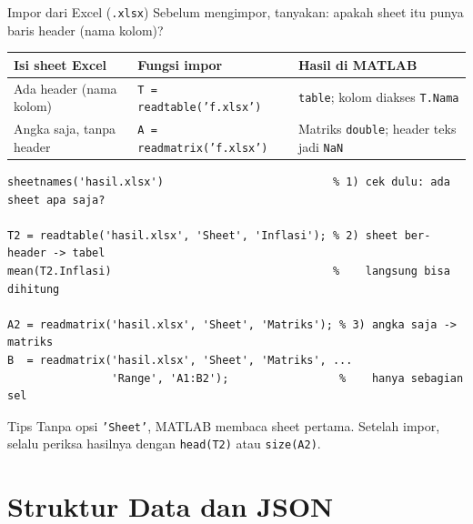 \documentclass[10pt,aspectratio=169]{beamer}
\newcommand{\kode}[1]{\texttt{\small #1}}
\begin{document}
\begin{frame}[fragile]{Impor dari Excel (\kode{.xlsx})}
  Sebelum mengimpor, tanyakan: \alert{apakah sheet itu punya baris header (nama kolom)?}

  \centering\footnotesize
  \begin{tabular}{l l l}
    \toprule
    \textbf{Isi sheet Excel} & \textbf{Fungsi impor} & \textbf{Hasil di MATLAB} \\
    \midrule
    Ada header (nama kolom)   & \texttt{T = readtable('f.xlsx')}  & \kode{table}; kolom diakses \kode{T.Nama} \\
    Angka saja, tanpa header  & \texttt{A = readmatrix('f.xlsx')} & Matriks \kode{double}; header teks jadi \kode{NaN} \\
    \bottomrule
  \end{tabular}
  \raggedright
\begin{lstlisting}
sheetnames('hasil.xlsx')                          % 1) cek dulu: ada sheet apa saja?

T2 = readtable('hasil.xlsx', 'Sheet', 'Inflasi'); % 2) sheet ber-header -> tabel
mean(T2.Inflasi)                                  %    langsung bisa dihitung

A2 = readmatrix('hasil.xlsx', 'Sheet', 'Matriks'); % 3) angka saja -> matriks
B  = readmatrix('hasil.xlsx', 'Sheet', 'Matriks', ...
                'Range', 'A1:B2');                 %    hanya sebagian sel
\end{lstlisting}
  \begin{exampleblock}{Tips}
    \small Tanpa opsi \kode{'Sheet'}, MATLAB membaca \alert{sheet pertama}.
    Setelah impor, selalu periksa hasilnya dengan \kode{head(T2)} atau \kode{size(A2)}.
  \end{exampleblock}
\end{frame}

\section{Struktur Data dan JSON}
\end{document}
